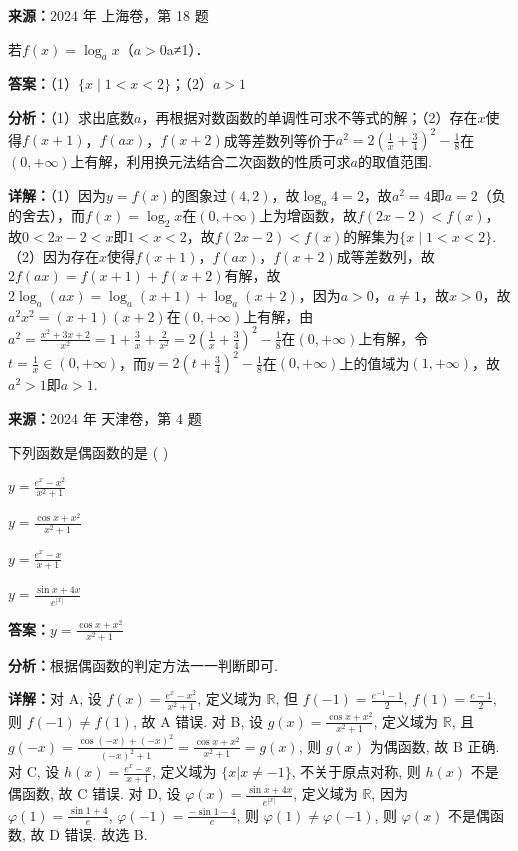 \begin{question}[points=14]
\textbf{来源：}2024 年 上海卷，第 18 题\par
若$f(x)=\log_a x$（$a>0$a≠1）．
\begin{solution}
\textbf{答案：}（1）$\{x\mid1<x<2\}$；（2）$a>1$

\textbf{分析：}（1）求出底数$a$，再根据对数函数的单调性可求不等式的解；（2）存在$x$使得$f(x+1)$，$f(ax)$，$f(x+2)$成等差数列等价于$a^2=2\left(\frac1x+\frac34\right)^2-\frac18$在$(0,+\infty)$上有解，利用换元法结合二次函数的性质可求$a$的取值范围.

\textbf{详解：}（1）因为$y=f(x)$的图象过$(4,2)$，故$\log_a4=2$，故$a^2=4$即$a=2$（负的舍去），而$f(x)=\log_2x$在$(0,+\infty)$上为增函数，故$f(2x-2)<f(x)$，故$0<2x-2<x$即$1<x<2$，故$f(2x-2)<f(x)$的解集为$\{x\mid1<x<2\}$.（2）因为存在$x$使得$f(x+1)$，$f(ax)$，$f(x+2)$成等差数列，故$2f(ax)=f(x+1)+f(x+2)$有解，故$2\log_a(ax)=\log_a(x+1)+\log_a(x+2)$，因为$a>0$，$a\neq1$，故$x>0$，故$a^2x^2=(x+1)(x+2)$在$(0,+\infty)$上有解，由$a^2=\frac{x^2+3x+2}{x^2}=1+\frac3x+\frac2{x^2}=2\left(\frac1x+\frac34\right)^2-\frac18$在$(0,+\infty)$上有解，令$t=\frac1x\in(0,+\infty)$，而$y=2\left(t+\frac34\right)^2-\frac18$在$(0,+\infty)$上的值域为$(1,+\infty)$，故$a^2>1$即$a>1$.
\end{solution}
\end{question}

\begin{question}[points=5]
\textbf{来源：}2024 年 天津卷，第 4 题\par
下列函数是偶函数的是 ( )
\begin{choices}
  \item $y = \frac{e^x - x^2}{x^2 + 1}$
  \item $y = \frac{\cos x + x^2}{x^2 + 1}$
  \item $y = \frac{e^x - x}{x + 1}$
  \item $y = \frac{\sin x + 4x}{e^{|x|}}$
\end{choices}
\begin{solution}
\textbf{答案：}$y = \frac{\cos x + x^2}{x^2 + 1}$

\textbf{分析：}根据偶函数的判定方法一一判断即可.

\textbf{详解：}对 A, 设 $f(x)=\frac{e^x-x^2}{x^2+1}$, 定义域为 $\mathbb{R}$, 但 $f(-1)=\frac{e^{-1}-1}{2}$, $f(1)=\frac{e-1}{2}$, 则 $f(-1)\neq f(1)$, 故 A 错误. 对 B, 设 $g(x)=\frac{\cos x+x^2}{x^2+1}$, 定义域为 $\mathbb{R}$, 且 $g(-x)=\frac{\cos(-x)+(-x)^2}{(-x)^2+1}=\frac{\cos x+x^2}{x^2+1}=g(x)$, 则 $g(x)$ 为偶函数, 故 B 正确. 对 C, 设 $h(x)=\frac{e^x-x}{x+1}$, 定义域为 $\{x|x\neq -1\}$, 不关于原点对称, 则 $h(x)$ 不是偶函数, 故 C 错误. 对 D, 设 $\varphi(x)=\frac{\sin x+4x}{e^{|x|}}$, 定义域为 $\mathbb{R}$, 因为 $\varphi(1)=\frac{\sin 1+4}{e}$, $\varphi(-1)=\frac{-\sin 1-4}{e}$, 则 $\varphi(1)\neq\varphi(-1)$, 则 $\varphi(x)$ 不是偶函数, 故 D 错误. 故选 B.
\end{solution}
\end{question}

